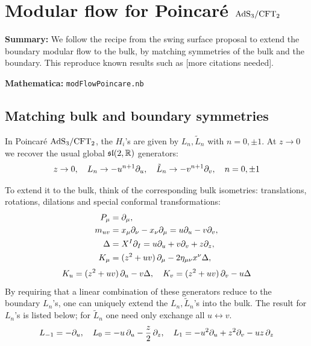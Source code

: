 \documentclass[11pt,a4paper]{article}
\begin{document}
\section{Modular flow for Poincar\'e $\mathrm{AdS}_3/\mathrm{CFT}_2$}
\label{sect:modFlowPoincare}

\textbf{Summary:} We follow the recipe from the swing surface proposal \cite{Apolo:2020bld,Apolo:2020qjm} to extend the boundary modular flow to the bulk, by matching symmetries of the bulk and the boundary. This reproduce known results such as \cite{Lashkari:2016idm,Czech:2019vih,Apolo:2020qjm} [more citations needed].

\noindent\textbf{Mathematica:} \texttt{modFlowPoincare.nb}

\subsection{Matching bulk and boundary symmetries}
	In Poincar\'e $\mathrm{AdS}_3/\mathrm{CFT}_2$, the $H_i$'s are given by $L_n,\tilde{L}_n$ with $n=0,\pm 1$. At $z\to 0$ we recover the usual global $\mathfrak{sl}(2,\mathbb{R})$ generators:
	\begin{equation}
		z\to 0,
	\quad
		      L_n \to -u^{n+1} \partial_{u},\quad
		\tilde{L}_n \to -v^{n+1} \partial_{v},\quad
	n = 0,\pm 1
	\end{equation}
	
	To extend it to the bulk, think of the corresponding bulk isometries: translations, rotations, dilations and special conformal transformations:
	\begin{equation}
	\begin{aligned}
		P_\mu
		&= \partial_{\mu},\\
		m_{uv}
		&= x_\mu \partial_{\nu} - x_\nu \partial_{\mu}
		= u\partial_{u} - v\partial_{v},\\
		\Delta
		&= X^I \partial_{I}
		= u\partial_{u} + v\partial_{v} + z\partial_{z},\\
		K_\mu
		&= (z^2 + uv)\,\partial_{\mu}
			- 2\eta_{\mu\nu} x^\nu \Delta,
	\end{aligned}
	\end{equation}
	\begin{equation}
		K_u = (z^2 + uv)\,\partial_{u} - v \Delta,
	\quad
		K_v = (z^2 + uv)\,\partial_{v} - u \Delta
	\end{equation}
	By requiring that a linear combination of these generators reduce to the boundary $L_n$'s, one can uniquely extend the $L_n,\tilde{L}_n$'s into the bulk. The result for $L_n$'s is listed below; for $\tilde{L}_n$ one need only exchange all $u\leftrightarrow v$.
	\begin{equation}
		L_{-1} = -\partial_{u},
	\quad
		L_0 = -u\,\partial_{u} - \frac{z}{2}\,\partial_{z},
	\quad
		L_1 = -u^2\partial_{u} + z^2 \partial_{v}
			- uz\,\partial_{z}
	\end{equation}
\end{document}
